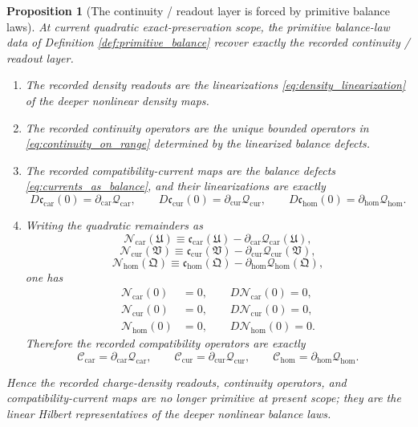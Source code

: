 \documentclass[11pt]{article}
\newcommand{\RootTensor}{\mathfrak U}
\newcommand{\RootRelabel}{\mathfrak V}
\newcommand{\RootFree}{\mathfrak Q}
\newcommand{\TensorCompat}{\mathcal C_{\mathrm{car}}}
\newcommand{\CurCompat}{\mathcal C_{\mathrm{cur}}}
\newcommand{\HomCompat}{\mathcal C_{\mathrm{hom}}}
\newcommand{\TensorCurrent}{\mathfrak c_{\mathrm{car}}}
\newcommand{\CurCurrent}{\mathfrak c_{\mathrm{cur}}}
\newcommand{\HomCurrent}{\mathfrak c_{\mathrm{hom}}}
\newcommand{\TensorDensity}{\mathcal Q_{\mathrm{car}}}
\newcommand{\CurDensity}{\mathcal Q_{\mathrm{cur}}}
\newcommand{\HomDensity}{\mathcal Q_{\mathrm{hom}}}
\newcommand{\TensorCont}{\partial_{\mathrm{car}}}
\newcommand{\CurCont}{\partial_{\mathrm{cur}}}
\newcommand{\HomCont}{\partial_{\mathrm{hom}}}
\newcommand{\TensorRemainder}{\mathcal N_{\mathrm{car}}}
\newcommand{\CurRemainder}{\mathcal N_{\mathrm{cur}}}
\newcommand{\HomRemainder}{\mathcal N_{\mathrm{hom}}}
\newtheorem{proposition}{Proposition}
\begin{document}
\begin{proposition}[The continuity / readout layer is forced by primitive balance laws]
\label{prop:continuity_from_balance}
At current quadratic exact-preservation scope, the primitive balance-law data of Definition \ref{def:primitive_balance} recover exactly the recorded continuity / readout layer.
\begin{enumerate}
    \item The recorded density readouts are the linearizations \eqref{eq:density_linearization} of the deeper nonlinear density maps.
    \item The recorded continuity operators are the unique bounded operators in \eqref{eq:continuity_on_range} determined by the linearized balance defects.
    \item The recorded compatibility-current maps are the balance defects \eqref{eq:currents_as_balance}, and their linearizations are exactly
    \begin{equation}
    D\TensorCurrent(0)=\TensorCont\TensorDensity,\qquad
    D\CurCurrent(0)=\CurCont\CurDensity,\qquad
    D\HomCurrent(0)=\HomCont\HomDensity.
    \label{eq:currents_from_balance}
    \end{equation}
    \item Writing the quadratic remainders as
    \begin{equation}
    \TensorRemainder(\RootTensor)\equiv\TensorCurrent(\RootTensor)-\TensorCont\TensorDensity(\RootTensor),
    \label{eq:car_remainder_from_balance}
    \end{equation}
    \begin{equation}
    \CurRemainder(\RootRelabel)\equiv\CurCurrent(\RootRelabel)-\CurCont\CurDensity(\RootRelabel),
    \label{eq:cur_remainder_from_balance}
    \end{equation}
    \begin{equation}
    \HomRemainder(\RootFree)\equiv\HomCurrent(\RootFree)-\HomCont\HomDensity(\RootFree),
    \label{eq:hom_remainder_from_balance}
    \end{equation}
    one has
    \begin{equation}
    \begin{aligned}
    \TensorRemainder(0)&=0,\qquad D\TensorRemainder(0)=0,
    \\
    \CurRemainder(0)&=0,\qquad D\CurRemainder(0)=0,
    \\
    \HomRemainder(0)&=0,\qquad D\HomRemainder(0)=0.
    \end{aligned}
    \label{eq:remainders_quadratic}
    \end{equation}
    Therefore the recorded compatibility operators are exactly
    \begin{equation}
    \TensorCompat=\TensorCont\TensorDensity,\qquad
    \CurCompat=\CurCont\CurDensity,\qquad
    \HomCompat=\HomCont\HomDensity.
    \label{eq:compat_from_balance}
    \end{equation}
\end{enumerate}
Hence the recorded charge-density readouts, continuity operators, and compatibility-current maps are no longer primitive at present scope; they are the linear Hilbert representatives of the deeper nonlinear balance laws.
\end{proposition}
\end{document}
